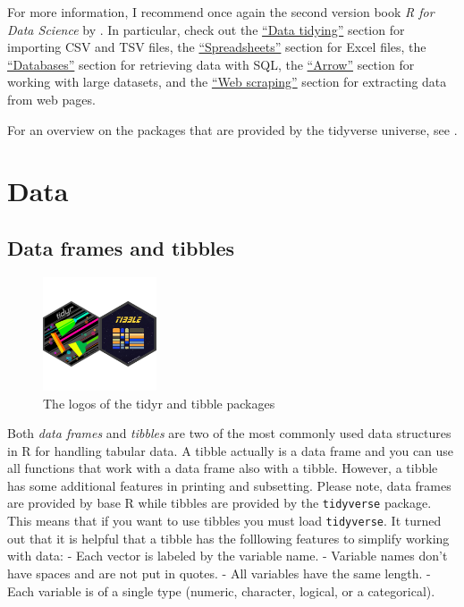 \documentclass[
  12pt,
  oneside]{book}
\theoremstyle{definition}
\theoremstyle{definition}
\theoremstyle{definition}
\theoremstyle{definition}
\theoremstyle{remark}
\begin{document}
For more information, I recommend once again the second version book \emph{R for Data Science} by \href{https://r4ds.hadley.nz/}{\citet{Wickham2023R}}. In particular, check out the \href{https://r4ds.hadley.nz/data-tidy.html}{``Data tidying''} section for importing CSV and TSV files, the \href{https://r4ds.hadley.nz/spreadsheets.html}{``Spreadsheets''} section for Excel files, the \href{https://r4ds.hadley.nz/databases.html}{``Databases''} section for retrieving data with SQL, the \href{https://r4ds.hadley.nz/arrow.html}{``Arrow''} section for working with large datasets, and the \href{https://r4ds.hadley.nz/webscraping.html}{``Web scraping''} section for extracting data from web pages.

For an overview on the packages that are provided by the tidyverse universe, see \href{https://www.tidyverse.org/packages/\#import}{}.

\hypertarget{sec:tidy}{%
\section{Data}\label{sec:tidy}}

\hypertarget{data-frames-and-tibbles}{%
\subsection{Data frames and tibbles}\label{data-frames-and-tibbles}}

\begin{figure}
\centering
\includegraphics[width=0.3\textwidth,height=\textheight]{fig/tidyr-tibble-logo.png}
\caption{\label{fig:tidyr-tibble-logo} The logos of the tidyr and tibble packages}
\end{figure}

Both \emph{data frames} and \emph{tibbles} are two of the most commonly used data structures in R for handling tabular data. A tibble actually is a data frame and you can use all functions that work with a data frame also with a tibble. However, a tibble has some additional features in printing and subsetting. Please note, data frames are provided by base R while tibbles are provided by the \texttt{tidyverse} package. This means that if you want to use tibbles you must load \texttt{tidyverse}. It turned out that it is helpful that a tibble has the folllowing features to simplify working with data:
- Each vector is labeled by the variable name.
- Variable names don't have spaces and are not put in quotes.
- All variables have the same length.
- Each variable is of a single type (numeric, character, logical, or a categorical).
\end{document}
